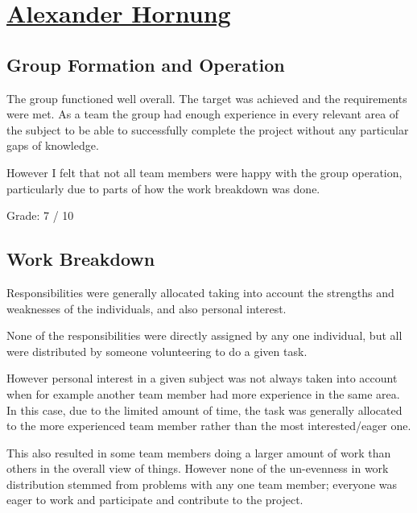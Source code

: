 %
%
% 

\section{\texorpdfstring{\href{mailto:ah3e11@ecs.soton.ac.uk}{Alexander Hornung}} {Alexander Hornung}}

\subsection{Group Formation and Operation}
The group functioned well overall. The target was achieved and the requirements
were met. As a team the group had enough experience in every relevant area of
the subject to be able to successfully complete the project without any particular
gaps of knowledge.

However I felt that not all team members were happy with the group operation, particularly
due to parts of how the work breakdown was done.

Grade: 7 / 10


\subsection{Work Breakdown}
Responsibilities were generally allocated taking into account the strengths
and weaknesses of the individuals, and also personal interest.

None of the responsibilities were directly assigned by any one individual, but
all were distributed by someone volunteering to do a given task.

However personal interest in a given subject was not always taken into account
when for example another team member had more experience in the same area. In this
case, due to the limited amount of time, the task was generally allocated to
the more experienced team member rather than the most interested/eager one.

This also resulted in some team members doing a larger amount of work than others
in the overall view of things. However none of the un-evenness in work distribution
stemmed from problems with any one team member; everyone was eager to work and
participate and contribute to the project.

